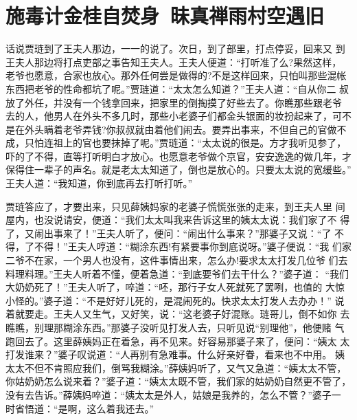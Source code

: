 \chapter{施毒计金桂自焚身~昧真禅雨村空遇旧}

话说贾琏到了王夫人那边，一一的说了。次日，到了部里，打点停妥，回来又
到王夫人那边将打点吏部之事告知王夫人。王夫人便道：“打听准了么?果然这样，
老爷也愿意，合家也放心。那外任何尝是做得的?不是这样回来，只怕叫那些混帐
东西把老爷的性命都坑了呢。”贾琏道：“太太怎么知道？”王夫人道：“自从你二
叔放了外任，并没有一个钱拿回来，把家里的倒掏摸了好些去了。你瞧那些跟老爷
去的人，他男人在外头不多几时，那些小老婆子们都金头银面的妆扮起来了，可不
是在外头瞒着老爷弄钱?你叔叔就由着他们闹去。要弄出事来，不但自己的官做不
成，只怕连祖上的官也要抹掉了呢。”贾琏道：“太太说的很是。方才我听见参了，
吓的了不得，直等打听明白才放心。也愿意老爷做个京官，安安逸逸的做几年，才
保得住一辈子的声名。就是老太太知道了，倒也是放心的。只要太太说的宽缓些。”
王夫人道：“我知道，你到底再去打听打听。”

贾琏答应了，才要出来，只见薛姨妈家的老婆子慌慌张张的走来，到王夫人里
间屋内，也没说请安，便道：“我们太太叫我来告诉这里的姨太太说：我们家了不
得了，又闹出事来了！”王夫人听了，便问：“闹出什么事来？”那婆子又说：“了
不得，了不得！”王夫人哼道：“糊涂东西!有紧要事你到底说呀。”婆子便说：“我
们家二爷不在家，一个男人也没有，这件事情出来，怎么办!要求太太打发几位爷
们去料理料理。”王夫人听着不懂，便着急道：“到底要爷们去干什么？”婆子道：
“我们大奶奶死了！”王夫人听了，啐道：“呸，那行子女人死就死了罢咧，也值的
大惊小怪的。”婆子道：“不是好好儿死的，是混闹死的。快求太太打发人去办办！”
说着就要走。王夫人又生气，又好笑，说：“这老婆子好混账。琏哥儿，倒不如你
去瞧瞧，别理那糊涂东西。”那婆子没听见打发人去，只听见说“别理他”，他便赌
气跑回去了。这里薛姨妈正在着急，再不见来。好容易那婆子来了，便问：“姨太
太打发谁来？”婆子叹说道：“人再别有急难事。什么好亲好眷，看来也不中用。
姨太太不但不肯照应我们，倒骂我糊涂。”薛姨妈听了，又气又急道：“姨太太不管，
你姑奶奶怎么说来着？”婆子道：“姨太太既不管，我们家的姑奶奶自然更不管了，
没有去告诉。”薛姨妈啐道：“姨太太是外人，姑娘是我养的，怎么不管？”婆子一
时省悟道：“是啊，这么着我还去。”

